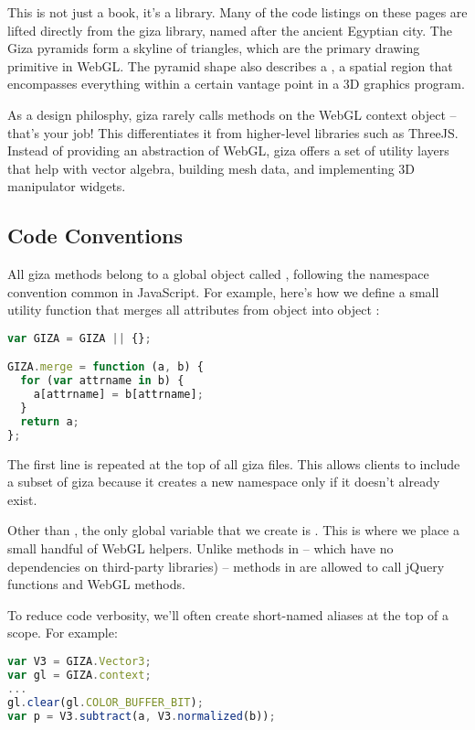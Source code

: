 This is not just a book, it's a library.  Many of the code listings on these pages are lifted directly from the giza library, named after the ancient Egyptian city.  The Giza pyramids form a skyline of triangles, which are the primary drawing primitive in WebGL.  The pyramid shape also describes a , a spatial region that encompasses everything within a certain vantage point in a 3D graphics program.

As a design philosphy, giza rarely calls methods on the WebGL context object -- that's your job!  This differentiates it from higher-level libraries such as ThreeJS.  Instead of providing an abstraction of WebGL, giza offers a set of utility layers that help with vector algebra, building mesh data, and implementing 3D manipulator widgets.

\subsection{Code Conventions}

All giza methods belong to a global object called , following the namespace convention common in JavaScript.  For example, here's how we define a small utility function that merges all attributes from object  into object :

\begin{lstlisting}[language=JavaScript]
var GIZA = GIZA || {};

GIZA.merge = function (a, b) {
  for (var attrname in b) {
    a[attrname] = b[attrname];
  }
  return a;
};
\end{lstlisting}

The first line is repeated at the top of all giza files.  This allows clients to include a subset of giza because it creates a new  namespace only if it doesn't already exist.

Other than , the only global variable that we create is .  This is where we place a small handful of WebGL helpers.  Unlike methods in  -- which have no dependencies on third-party libraries) -- methods in  are allowed to call jQuery functions and WebGL methods.

To reduce code verbosity, we'll often create short-named aliases at the top of a scope.  For example:

\begin{lstlisting}[language=JavaScript]
var V3 = GIZA.Vector3;
var gl = GIZA.context;
...
gl.clear(gl.COLOR_BUFFER_BIT);
var p = V3.subtract(a, V3.normalized(b));
\end{lstlisting}

